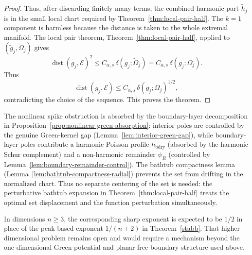 \documentclass[a4paper,10pt]{amsart}
\begin{document}
\begin{proof}
Thus, after discarding finitely many terms, the combined harmonic part
$\widetilde h_j$ is in the small local chart required by
Theorem~\ref{thm:local-pair-half}.  The $k=1$ component is harmless because
the distance is taken to the whole extremal manifold.  The local pair theorem,
Theorem~\ref{thm:local-pair-half}, applied to
$(\widetilde g_j,\widetilde\Omega_j)$ gives
\[
\operatorname{dist}(\widetilde g_j,\mathcal E)^2
\le
C_{\alpha,s}\,\delta(\widetilde g_j;\widetilde\Omega_j)
=
C_{\alpha,s}\,\delta(g_j;\Omega_j).
\]
Thus
\[
\operatorname{dist}(g_j,\mathcal E)
\le
C_{\alpha,s}\,\delta(g_j;\Omega_j)^{1/2},
\]
contradicting the choice of the sequence. This proves the theorem.
\end{proof}

\begin{numrem}
The nonlinear spike obstruction is absorbed by the boundary-layer
decomposition in Proposition~\ref{prop:nonlinear-green-absorption}:
interior poles are controlled by the genuine Green-kernel gap
(Lemma~\ref{lem:interior-green-gap}), while boundary-layer poles contribute
a harmonic Poisson profile $h_{\mathrm{bdry}}$ (absorbed by the harmonic
Schur complement) and a non-harmonic remainder $\psi_R$ (controlled by
Lemma~\ref{lem:boundary-remainder-control}).  The bathtub compactness lemma
(Lemma~\ref{lem:bathtub-compactness-radial}) prevents the set from drifting
in the normalized chart.  Thus no separate centering of the set is needed:
the perturbative bathtub expansion in Theorem~\ref{thm:local-pair-half}
treats the optimal set displacement and the function perturbation
simultaneously.
\end{numrem}

In dimensions $n\ge 3$, the corresponding sharp exponent is expected to be
$1/2$ in place of the peak-based exponent $1/(n+2)$ in Theorem~\ref{stabb}.
That higher-dimensional problem remains open and would require a mechanism
beyond the one-dimensional Green-potential and planar free-boundary structure
used above.

\end{document}
